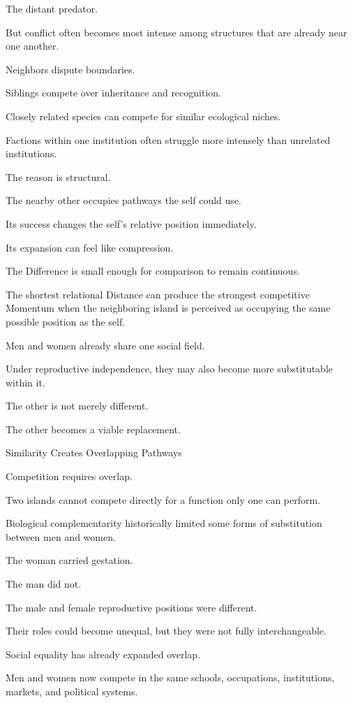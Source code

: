 The distant predator.

But conflict often becomes most intense among structures that are already near one another.

Neighbors dispute boundaries.

Siblings compete over inheritance and recognition.

Closely related species can compete for similar ecological niches.

Factions within one institution often struggle more intensely than unrelated institutions.

The reason is structural.

The nearby other occupies pathways the self could use.

Its success changes the self’s relative position immediately.

Its expansion can feel like compression.

The Difference is small enough for comparison to remain continuous.

The shortest relational Distance can produce the strongest competitive Momentum when the neighboring island is perceived as occupying the same possible position as the self.

Men and women already share one social field.

Under reproductive independence, they may also become more substitutable within it.

The other is not merely different.

The other becomes a viable replacement.

Similarity Creates Overlapping Pathways

Competition requires overlap.

Two islands cannot compete directly for a function only one can perform.

Biological complementarity historically limited some forms of substitution between men and women.

The woman carried gestation.

The man did not.

The male and female reproductive positions were different.

Their roles could become unequal, but they were not fully interchangeable.

Social equality has already expanded overlap.

Men and women now compete in the same schools, occupations, institutions, markets, and political systems.

